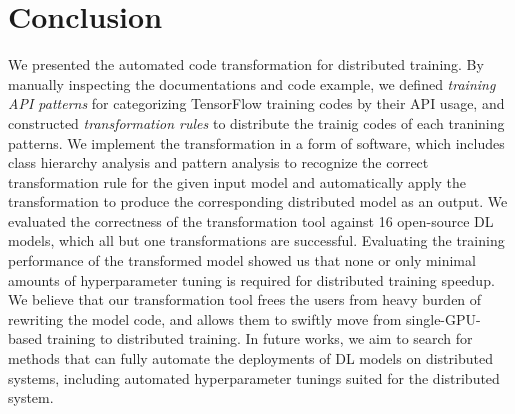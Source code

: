 \section{Conclusion}\label{sec:conclusion}

We presented the automated code transformation for distributed training.  
By manually inspecting the documentations and code example,
we defined \textit{training API patterns} for categorizing TensorFlow
training codes by their API usage, and constructed \textit{transformation rules}
to distribute the trainig codes of each tranining patterns.
We implement the transformation in a form of software,
which includes class hierarchy analysis and pattern analysis to recognize
the correct transformation rule for the given input model
and automatically apply the transformation to produce
the corresponding distributed model as an output.
We evaluated the correctness of the transformation tool against
16 open-source DL models, which all but one transformations are
successful. Evaluating the training performance of the
transformed model showed us that none or only minimal amounts of
hyperparameter tuning is required for distributed training speedup. 
We believe that our transformation tool frees the users from
heavy burden of rewriting the model code, and allows them to
swiftly move from single-GPU-based training to distributed training.
In future works, we aim to search for methods that can fully automate
the deployments of DL models on distributed systems, including
automated hyperparameter tunings suited for the distributed system.
